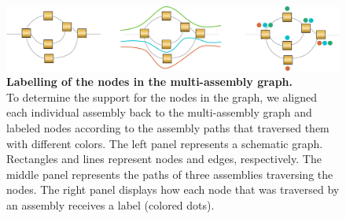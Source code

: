 \documentclass[../main.tex]{subfiles}
\begin{document}
\fi


\newpage

\setcounter{subsection}{0}
\renewcommand \thesubsection {Note S4.\arabic{subsection}}
\renewcommand \theHsubsection {Note S4.\arabic{subsection}}
\setcounter{figure}{0}
\renewcommand \thefigure {S4.\arabic{figure}}
\setcounter{table}{0}
\renewcommand \thetable {S4.\arabic{table}}

\begin{flushleft}

\begin{figure}[!htb]
    \centering
    \includegraphics[width=\textwidth]{paper3/supplement/sp41.pdf}
    \caption[Node labelling procedures]{\textbf{Labelling of the nodes in the multi-assembly graph.} \\
    \small{To determine the support for the nodes in the graph, we aligned each individual assembly back to the multi-assembly graph and labeled nodes according to the assembly paths that traversed them with different colors. The left panel represents a schematic graph. Rectangles and lines represent nodes and edges, respectively. The middle panel represents the paths of three assemblies traversing the nodes. The right panel displays how each node that was traversed by an assembly receives a label (colored dots).}}
    \label{sup_fig:s41}
\end{figure}


\newpage


\end{flushleft}
\end{document}
